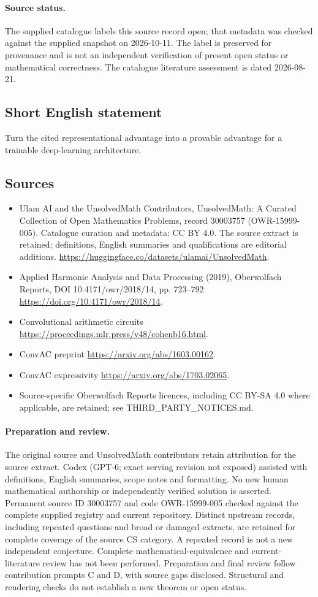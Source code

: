 \documentclass[11pt]{article}
\begin{document}
\paragraph{Source status.}
The supplied catalogue labels this source record open; that metadata was checked against the supplied snapshot on 2026-10-11. The label is preserved for provenance and is not an independent verification of present open status or mathematical correctness. The catalogue literature assessment is dated 2026-08-21.
\subsection{Short English statement}
Turn the cited representational advantage into a provable advantage for a trainable deep-learning architecture.
\subsection{Sources}
\begin{itemize}
\item[S1] Ulam AI and the UnsolvedMath Contributors, UnsolvedMath: A Curated Collection of Open Mathematics Problems, record 30003757 (OWR-15999-005). Catalogue curation and metadata: CC BY 4.0. The source extract is retained; definitions, English summaries and qualifications are editorial additions.
\url{https://huggingface.co/datasets/ulamai/UnsolvedMath}.
\item[S2] Applied Harmonic Analysis and Data Processing (2019), Oberwolfach Reports, DOI 10.4171/owr/2018/14, pp. 723--792
\url{https://doi.org/10.4171/owr/2018/14}.
\item[S3] Convolutional arithmetic circuits
\url{https://proceedings.mlr.press/v48/cohenb16.html}.
\item[S4] ConvAC preprint
\url{https://arxiv.org/abs/1603.00162}.
\item[S5] ConvAC expressivity
\url{https://arxiv.org/abs/1703.02065}.
\item Source-specific Oberwolfach Reports licences, including CC BY-SA 4.0 where applicable, are retained; see THIRD\_PARTY\_NOTICES.md.
\end{itemize}
\paragraph{Preparation and review.}
The original source and UnsolvedMath contributors retain attribution for the source extract. Codex (GPT-6; exact serving revision not exposed) assisted with definitions, English summaries, scope notes and formatting. No new human mathematical authorship or independently verified solution is asserted. Permanent source ID 30003757 and code OWR-15999-005 checked against the complete supplied registry and current repository. Distinct upstream records, including repeated questions and broad or damaged extracts, are retained for complete coverage of the source CS category. A repeated record is not a new independent conjecture. Complete mathematical-equivalence and current-literature review has not been performed. Preparation and final review follow contribution prompts C and D, with source gaps disclosed. Structural and rendering checks do not establish a new theorem or open status.
\label{end:30003757}
\end{document}
